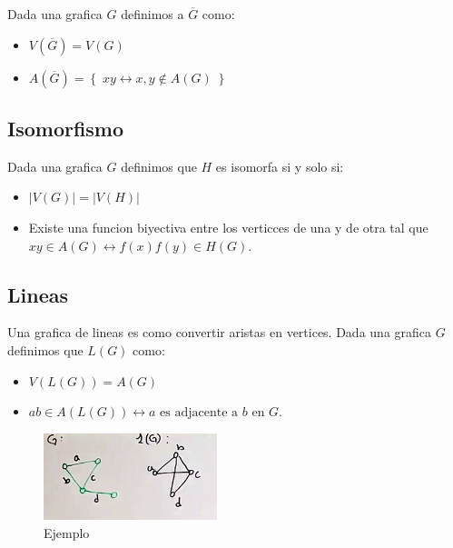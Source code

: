 \documentclass[12pt, fleqn]{report}                             %
\newcommand \Over               {\overline}                     %
\theoremstyle{break}                                            %
\newcommand \lIff    {\leftrightarrow}                          %
\newcommand{\Set}[1]            {\left\{ \; #1 \; \right\}}     %
\begin{document}
                Dada una grafica $G$ definimos a $\Over{G}$ como:
                \begin{itemize}
                    \item $V(\Over{G}) = V (G)$
                    \item $A(\Over{G}) = \Set{xy \lIff x, y \not \in A(G)}$
                \end{itemize}

            \subsection{Isomorfismo}

                Dada una grafica $G$ definimos que $H$ es isomorfa si y solo si:
                \begin{itemize}
                    \item $|V(G)| = |V(H)|$
                    \item Existe una funcion biyectiva entre los verticces de una y de otra tal que
                    $xy \in A(G) \lIff f(x)f(y) \in H(G)$.
                \end{itemize}


            \subsection{Lineas}
            
                Una grafica de lineas es como convertir aristas en vertices.
                Dada una grafica $G$ definimos que $L(G)$ como:
                \begin{itemize}
                    \item $V(L(G)) = A(G)$
                    \item $ab \in A(L(G)) \lIff a \text{ es adjacente a } b \text{ en } G$.
                \end{itemize}

                \begin{figure}[h]
                    \centering
                    \includegraphics[width=0.45\textwidth]{lineas}
                    \caption{Ejemplo}
                \end{figure}
\end{document}
